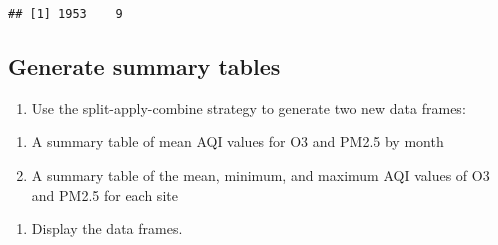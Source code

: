 \documentclass[]{article}
\newenvironment{Shaded}{\begin{snugshade}}{\end{snugshade}}
\newcommand{\KeywordTok}[1]{\textcolor[rgb]{0.13,0.29,0.53}{\textbf{#1}}}
\newcommand{\DataTypeTok}[1]{\textcolor[rgb]{0.13,0.29,0.53}{#1}}
\newcommand{\FloatTok}[1]{\textcolor[rgb]{0.00,0.00,0.81}{#1}}
\newcommand{\StringTok}[1]{\textcolor[rgb]{0.31,0.60,0.02}{#1}}
\newcommand{\CommentTok}[1]{\textcolor[rgb]{0.56,0.35,0.01}{\textit{#1}}}
\newcommand{\OtherTok}[1]{\textcolor[rgb]{0.56,0.35,0.01}{#1}}
\newcommand{\NormalTok}[1]{#1}
\providecommand{\tightlist}{%
  \setlength{\itemsep}{0pt}\setlength{\parskip}{0pt}}
\begin{document}
\begin{verbatim}
## [1] 1953    9
\end{verbatim}

\begin{Shaded}
\end{Shaded}

\subsection{Generate summary tables}\label{generate-summary-tables}

\begin{enumerate}
\def\labelenumi{\arabic{enumi}.}
\setcounter{enumi}{11}
\tightlist
\item
  Use the split-apply-combine strategy to generate two new data frames:
\end{enumerate}

\begin{enumerate}
\def\labelenumi{\alph{enumi}.}
\tightlist
\item
  A summary table of mean AQI values for O3 and PM2.5 by month
\item
  A summary table of the mean, minimum, and maximum AQI values of O3 and
  PM2.5 for each site
\end{enumerate}

\begin{enumerate}
\def\labelenumi{\arabic{enumi}.}
\setcounter{enumi}{12}
\tightlist
\item
  Display the data frames.
\end{enumerate}
\end{document}
